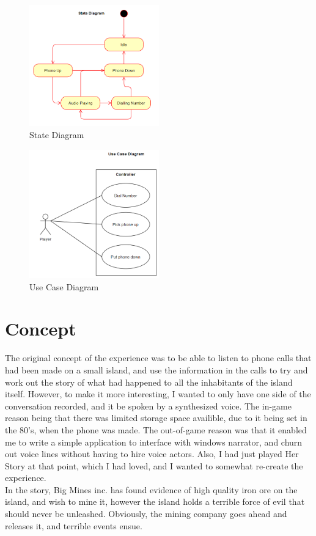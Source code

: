 \documentclass[12pt]{article}
\begin{document}
\begin{figure}[h]
    \centering
    \includegraphics[width=0.5\textwidth]{StateDiagram}
    \caption{State Diagram}
\end{figure}

\begin{figure}[h]
    \centering
    \includegraphics[width=0.5\textwidth]{UseCaseDiagram}
    \caption{Use Case Diagram}
\end{figure}

\FloatBarrier
\section{Concept} %
The original concept of the experience was to be able to listen to phone calls that had been made on a small island,
and use the information in the calls to try and work out the story of what had happened to all the inhabitants of the island itself.
However, to make it more interesting, I wanted to only have one side of the conversation recorded,
and it be spoken by a synthesized voice. 
The in-game reason being that there was limited storage space availible, 
due to it being set in the 80's, when the phone was made. 
The out-of-game reason was that it enabled me to write a simple application to interface with windows narrator,
and churn out voice lines without having to hire voice actors. 
Also, I had just played Her Story at that point, which I had loved, 
and I wanted to somewhat re-create the experience.\\
In the story, Big Mines inc. has found evidence of high quality iron ore on the island, 
and wish to mine it, however the island holds a terrible force of evil that should never be unleashed.
Obviously, the mining company goes ahead and releases it, and terrible events ensue.
\end{document}
